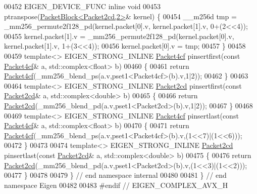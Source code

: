 \begin{DoxyCode}
00452 EIGEN\_DEVICE\_FUNC \textcolor{keyword}{inline} \textcolor{keywordtype}{void}
00453 ptranspose(\hyperlink{struct_eigen_1_1internal_1_1_packet_block}{PacketBlock<Packet2cd,2>}& kernel) \{
00454   \_\_m256d tmp = \_mm256\_permute2f128\_pd(kernel.packet[0].v, kernel.packet[1].v, 0+(2<<4));
00455   kernel.packet[1].v = \_mm256\_permute2f128\_pd(kernel.packet[0].v, kernel.packet[1].v, 1+(3<<4));
00456  kernel.packet[0].v = tmp;
00457 \}
00458 
00459 \textcolor{keyword}{template}<> EIGEN\_STRONG\_INLINE \hyperlink{struct_eigen_1_1internal_1_1_packet4cf}{Packet4cf} pinsertfirst(\textcolor{keyword}{const} \hyperlink{struct_eigen_1_1internal_1_1_packet4cf}{Packet4cf}& a, 
      std::complex<float> b)
00460 \{
00461   \textcolor{keywordflow}{return} \hyperlink{struct_eigen_1_1internal_1_1_packet4cf}{Packet4cf}(\_mm256\_blend\_ps(a.v,pset1<Packet4cf>(b).v,1|2));
00462 \}
00463 
00464 \textcolor{keyword}{template}<> EIGEN\_STRONG\_INLINE \hyperlink{struct_eigen_1_1internal_1_1_packet2cd}{Packet2cd} pinsertfirst(\textcolor{keyword}{const} \hyperlink{struct_eigen_1_1internal_1_1_packet2cd}{Packet2cd}& a, 
      std::complex<double> b)
00465 \{
00466   \textcolor{keywordflow}{return} \hyperlink{struct_eigen_1_1internal_1_1_packet2cd}{Packet2cd}(\_mm256\_blend\_pd(a.v,pset1<Packet2cd>(b).v,1|2));
00467 \}
00468 
00469 \textcolor{keyword}{template}<> EIGEN\_STRONG\_INLINE \hyperlink{struct_eigen_1_1internal_1_1_packet4cf}{Packet4cf} pinsertlast(\textcolor{keyword}{const} \hyperlink{struct_eigen_1_1internal_1_1_packet4cf}{Packet4cf}& a, 
      std::complex<float> b)
00470 \{
00471   \textcolor{keywordflow}{return} \hyperlink{struct_eigen_1_1internal_1_1_packet4cf}{Packet4cf}(\_mm256\_blend\_ps(a.v,pset1<Packet4cf>(b).v,(1<<7)|(1<<6)));
00472 \}
00473 
00474 \textcolor{keyword}{template}<> EIGEN\_STRONG\_INLINE \hyperlink{struct_eigen_1_1internal_1_1_packet2cd}{Packet2cd} pinsertlast(\textcolor{keyword}{const} \hyperlink{struct_eigen_1_1internal_1_1_packet2cd}{Packet2cd}& a, 
      std::complex<double> b)
00475 \{
00476   \textcolor{keywordflow}{return} \hyperlink{struct_eigen_1_1internal_1_1_packet2cd}{Packet2cd}(\_mm256\_blend\_pd(a.v,pset1<Packet2cd>(b).v,(1<<3)|(1<<2)));
00477 \}
00478 
00479 \} \textcolor{comment}{// end namespace internal}
00480 
00481 \} \textcolor{comment}{// end namespace Eigen}
00482 
00483 \textcolor{preprocessor}{#endif // EIGEN\_COMPLEX\_AVX\_H}
\end{DoxyCode}

